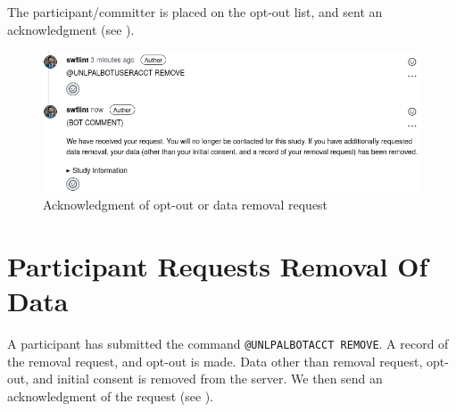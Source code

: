 \documentclass[paper=letter,fontsize=11pt,DIV=14]{scrartcl}
\begin{document}
The participant/committer is placed on the opt-out list, and sent an acknowledgment (see ).

\begin{figure}[h]
\centering
\includegraphics[width=\linewidth,frame]{./acknowledgment-removal.png}
\caption{Acknowledgment of opt-out or data removal request}
\label{fig:opt-out-removal-ack}
\end{figure}

\section{Participant Requests Removal Of Data}\label{removal-requested}

A participant has submitted the command \texttt{@UNLPALBOTACCT\ REMOVE}.
A record of the removal request, and opt-out is made.
Data other than removal request, opt-out, and initial consent is removed from the server.
We then send an acknowledgment of the request (see ).
\end{document}
